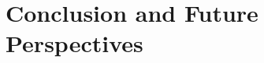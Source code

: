 \documentclass[10pt]{article}
\begin{document}


\section{Conclusion and Future Perspectives}
\label{sec:concl}

\blindtext






\end{document}
